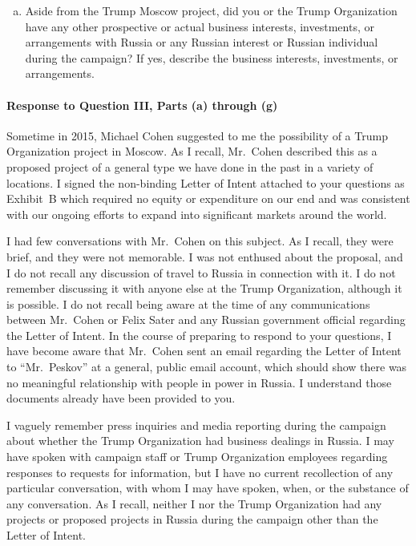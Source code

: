 \begin{enumerate}[a.]
\item Aside from the Trump Moscow project, did you or the Trump Organization have any other prospective or actual business interests, investments, or arrangements with Russia or any Russian interest or Russian individual during the campaign?
If yes, describe the business interests, investments, or arrangements.

\end{enumerate}

\paragraph*{Response to Question III, Parts (a) through (g)}

Sometime in 2015, Michael Cohen suggested to me the possibility of a Trump Organization project in Moscow.
As I recall, Mr.~Cohen described this as a proposed project of a general type we have done in the past in a variety of locations.
I signed the non-binding Letter of Intent attached to your questions as Exhibit~B which required no equity or expenditure on our end and was consistent with our ongoing efforts to expand into significant markets around the world.

I had few conversations with Mr.~Cohen on this subject.
As I recall, they were brief, and they were not memorable.
I was not enthused about the proposal, and I do not recall any discussion of travel to Russia in connection with it.
I do not remember discussing it with anyone else at the Trump Organization, although it is possible.
I do not recall being aware at the time of any communications between Mr.~Cohen or Felix Sater and any Russian government official regarding the Letter of Intent.
In the course of preparing to respond to your questions, I have become aware that Mr.~Cohen sent an email regarding the Letter of Intent to ``Mr.~Peskov'' at a general, public email account, which should show there was no meaningful relationship with people in power in Russia.
I understand those documents already have been provided to you.

I vaguely remember press inquiries and media reporting during the campaign about whether the Trump Organization had business dealings in Russia.
I may have spoken with campaign staff or Trump Organization employees regarding responses to requests for information, but I have no current recollection of any particular conversation, with whom I may have spoken, when, or the substance of any conversation.
As I recall, neither I nor the Trump Organization had any projects or proposed projects in Russia during the campaign other than the Letter of Intent.

